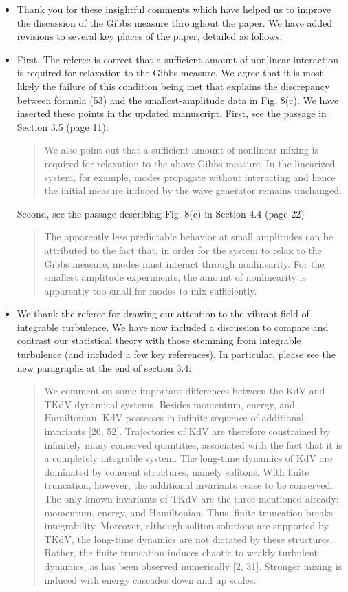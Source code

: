 \documentclass[11pt]{article}
\begin{document}
\begin{itemize}
\item Thank you for these insightful comments which have helped us to improve the discussion of the Gibbs measure throughout the paper. We have added revisions to several key places of the paper, detailed as follows:
\item First, The referee is correct that a sufficient amount of nonlinear interaction is  required for relaxation to the Gibbs measure. We agree that it is most likely the failure of this condition being met that explains the discrepancy between formula (53) and the smallest-amplitude data in Fig. 8(c). We have inserted these points in the updated manuscript. First, see the passage in Section 3.5 (page 11):
\begin{quotation}
We also point out that a sufficient amount of nonlinear mixing is required for relaxation to the above Gibbs measure. In the linearized system, for example, modes propagate without interacting and hence the initial measure induced by the wave generator remains unchanged.
\end{quotation}
Second, see the passage describing Fig. 8(c) in Section 4.4 (page 22)
\begin{quotation}
The apparently less predictable behavior at small amplitudes can be attributed to the fact that, in order for the system to relax to the Gibbs measure, modes must interact through nonlinearity. For the smallest amplitude experiments, the amount of nonlinearity is apparently too small for  modes to mix sufficiently.
\end{quotation}
%
\item We thank the referee for drawing our attention to the vibrant field of integrable turbulence. We have now included a discussion to compare and contrast our statistical theory with those stemming from integrable turbulence (and included a few key references). In particular, please see the new paragraphs at the end of section 3.4:
\begin{quotation}
We comment on some important differences between the KdV and TKdV dynamical systems. Besides momentum, energy, and Hamiltonian, KdV possesses in infinite sequence of additional invariants [26, 52]. Trajectories of KdV are therefore constrained by infinitely many conserved quantities, associated with the fact that it is a completely integrable system. The long-time dynamics of KdV are dominated by coherent structures, namely solitons. With finite truncation, however, the additional invariants cease to be conserved. The only known invariants of TKdV are the three mentioned already: momentum, energy, and Hamiltonian. Thus, finite truncation breaks integrability. Moreover, although soliton solutions are supported by TKdV, the long-time dynamics are not dictated by these structures. Rather, the finite truncation induces chaotic to weakly turbulent dynamics, as has been observed numerically [2, 31]. Stronger mixing is induced with energy cascades down and up scales.


\end{quotation}
\end{itemize}
\end{document}
